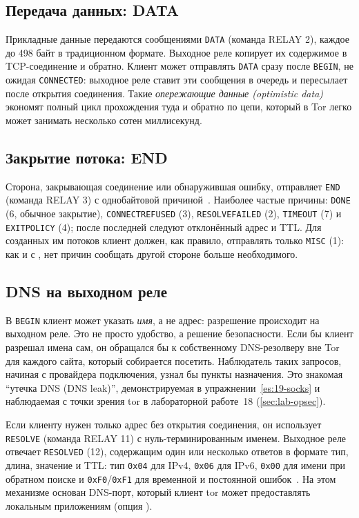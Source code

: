 \subsection{Передача данных: DATA}

Прикладные данные передаются сообщениями \texttt{DATA} (команда RELAY 2), каждое до 498 байт в традиционном формате. Выходное реле копирует их содержимое в TCP-соединение и обратно. Клиент может отправлять \texttt{DATA} сразу после \texttt{BEGIN}, не ожидая \texttt{CONNECTED}: выходное реле ставит эти сообщения в очередь и пересылает после открытия соединения. Такие \emph{опережающие данные (optimistic data)} экономят полный цикл прохождения туда и обратно по цепи, который в Tor легко может занимать несколько сотен миллисекунд.

\subsection{Закрытие потока: END}

Сторона, закрывающая соединение или обнаружившая ошибку, отправляет \texttt{END} (команда RELAY 3) с однобайтовой причиной~. Наиболее частые причины: \texttt{DONE} (6, обычное закрытие), \texttt{CONNECTREFUSED} (3), \texttt{RESOLVEFAILED} (2), \texttt{TIMEOUT} (7) и \texttt{EXITPOLICY} (4); после последней следуют отклонённый адрес и TTL. Для созданных им потоков клиент должен, как правило, отправлять только \texttt{MISC} (1): как и с , нет причин сообщать другой стороне больше необходимого.

\subsection{DNS на выходном реле}\label{sec:stream-dns}

В \texttt{BEGIN} клиент может указать \emph{имя}, а не адрес: разрешение происходит на выходном реле. Это не просто удобство, а решение безопасности. Если бы клиент разрешал имена сам, он обращался бы к собственному DNS-резолверу вне Tor для каждого сайта, который собирается посетить. Наблюдатель таких запросов, начиная с провайдера подключения, узнал бы пункты назначения. Это знакомая \enquote{утечка DNS (DNS leak)}, демонстрируемая в упражнении~\ref{es:19-socks} и наблюдаемая с точки зрения tor в лабораторной работе~18 (\cref{sec:lab-opsec}).

Если клиенту нужен только адрес без открытия соединения, он использует \texttt{RESOLVE} (команда RELAY 11) с нуль-терминированным именем. Выходное реле отвечает \texttt{RESOLVED} (12), содержащим один или несколько ответов в формате тип, длина, значение и TTL: тип \texttt{0x04} для IPv4, \texttt{0x06} для IPv6, \texttt{0x00} для имени при обратном поиске и \texttt{0xF0}/\texttt{0xF1} для временной и постоянной ошибок~. На этом механизме основан DNS-порт, который клиент tor может предоставлять локальным приложениям (опция ).

